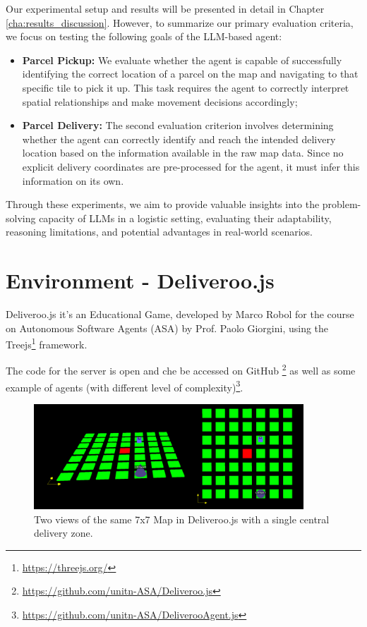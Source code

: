 Our experimental setup and results will be presented in detail in Chapter
\ref{cha:results_discussion}. However, to summarize our primary evaluation
criteria, we focus on testing the following goals of the LLM-based agent:

\begin{itemize}
  \item \textbf{Parcel Pickup:} We evaluate whether the agent is capable of
    successfully identifying the correct location of a parcel on the map and
    navigating to that specific tile to pick it up. This task requires the agent
    to correctly interpret spatial relationships and make movement decisions accordingly;

  \item \textbf{Parcel Delivery:} The second evaluation criterion involves
    determining whether the agent can correctly identify and reach the intended
    delivery location based on the information available in the raw map data. Since
    no explicit delivery coordinates are pre-processed for the agent, it must
    infer this information on its own.
\end{itemize}

Through these experiments, we aim to provide valuable insights into the problem-solving
capacity of LLMs in a logistic setting, evaluating their adaptability, reasoning
limitations, and potential advantages in real-world scenarios.

\section{Environment - Deliveroo.js}
\label{sec:environment_deliveroo_js}

Deliveroo.js it's an Educational Game, developed by Marco Robol for the course
on Autonomous Software Agents (ASA) by Prof. Paolo Giorgini, using the Treejs\footnote{\url{https://threejs.org/}}
framework.

The code for the server is open and che be accessed on GitHub \footnote{\url{https://github.com/unitn-ASA/Deliveroo.js}}
as well as some example of agents (with different level of complexity)\footnote{\url{https://github.com/unitn-ASA/DeliverooAgent.js}}.

\begin{figure}[h!]
  \centering
  \includegraphics[width=0.90\textwidth]{images/deliveroo_js.png}
  \caption{Two views of the same 7x7 Map in Deliveroo.js with a single central
  delivery zone.}
  \label{fig:deliveroo_js}
\end{figure}

